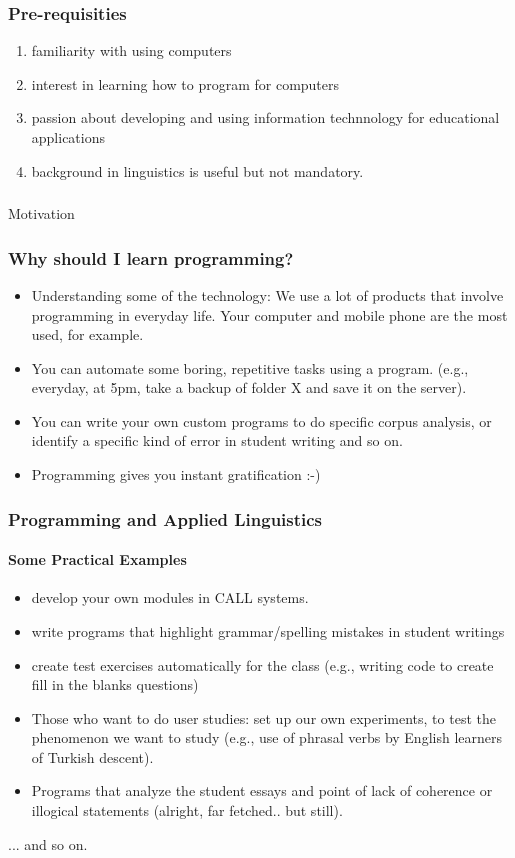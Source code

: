 \documentclass{beamer}
\begin{document}
\begin{frame}
\frametitle{Pre-requisities}
\begin{enumerate}
\item familiarity with using computers
\item interest in learning how to program for computers
\item passion about developing and using information technnology for educational applications
\item background in linguistics is useful but not mandatory.
\end{enumerate}
\end{frame}

\begin{frame}
\frametitle{}
\begin{center}
\Large Motivation
\end{center}
\end{frame}

\begin{frame}
\frametitle{Why should I learn programming?}
\begin{itemize}
\item Understanding some of the technology: We use a lot of products that involve programming in everyday life. Your computer and mobile phone are the most used, for example.
\item You can automate some boring, repetitive tasks using a program. (e.g., everyday, at 5pm, take a backup of folder X and save it on the server).
\item You can write your own custom programs to do specific corpus analysis, or identify a specific kind of error in student writing and so on.
\item Programming gives you instant gratification :-)
\end{itemize}
\end{frame}

\begin{frame}
\frametitle{Programming and Applied Linguistics}
\framesubtitle{Some Practical Examples}
\begin{itemize}
\item develop your own modules in CALL systems. 
\item write programs that highlight grammar/spelling mistakes in student writings
\item create test exercises automatically for the class (e.g., writing code to create fill in the blanks questions)
\item Those who want to do user studies: set up our own experiments, to test the phenomenon we want to study (e.g., use of phrasal verbs by English learners of Turkish descent).
\item Programs that analyze the student essays and point of lack of coherence or illogical statements (alright, far fetched.. but still). 
\end{itemize}
... and so on.
\end{frame}
\end{document}
